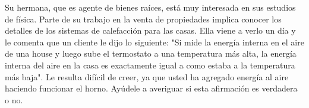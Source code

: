 \item Su hermana, que es agente de bienes raíces, está muy interesada en sus estudios de física. Parte de su trabajo en la venta de propiedades implica conocer los detalles de los sistemas de calefacción para las casas. Ella viene a verlo un día y le comenta que un cliente le dijo lo siguiente: "Si mide la energía interna en el aire de una house y luego sube el termostato a una temperatura más alta, la energía interna del aire en la casa es exactamente igual a como estaba a la temperatura más baja". Le resulta difícil de creer, ya que usted ha agregado energía al aire haciendo funcionar el horno. Ayúdele a averiguar si esta afirmación es verdadera o no.
